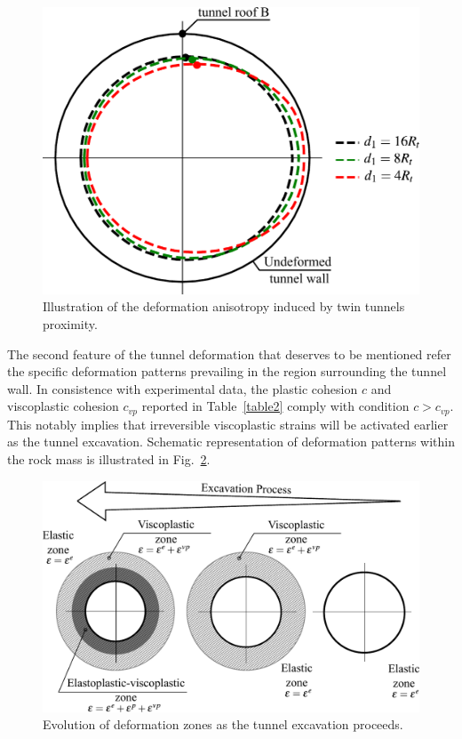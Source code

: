 \documentclass[a4paper,fleqn]{cas-sc}
\begin{document}
\begin{figure}[h!]
	\centering
	\includegraphics[scale=0.5]{Ovalization effect and monitoring point.pdf}
	\caption{Illustration of the deformation anisotropy induced by twin tunnels proximity.}
	\label{Ovalization effect and monitoring point}
\end{figure}
\FloatBarrier

The second feature of the tunnel deformation that deserves to be mentioned refer the specific deformation patterns prevailing in the region surrounding the tunnel wall. In consistence with experimental data, the plastic cohesion $c$ and viscoplastic cohesion $c_{vp}$ reported in Table~\ref{table2} comply with condition  $c > c_{vp}$. This notably implies that irreversible viscoplastic strains will be activated earlier as the tunnel excavation. Schematic representation of deformation patterns within the rock mass is illustrated in Fig.~\ref{zones}.

\begin{figure}[h!]
	\centering
	\includegraphics[scale=0.6]{zones.pdf}
	\caption{Evolution of deformation zones as the tunnel excavation proceeds.}
	\label{zones}
\end{figure}
\end{document}
